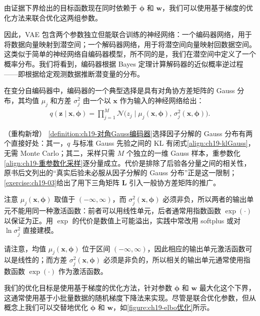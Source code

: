 \documentclass[../../main.tex]{subfiles}
\begin{document}
由证据下界给出的目标函数现在同时依赖于 $\bm{\phi}$ 和 $\bm{w}$，我们可以使用基于梯度的优化方法来联合优化这两组参数。

因此，VAE 包含两个参数独立但能联合训练的神经网络：一个编码器网络，用于将数据向量映射到潜空间；一个解码器网络，用于将潜空间向量映射回数据空间。这类似于简单的神经网络自编码器模型，所不同的是，我们在潜空间中定义了一个概率分布。我们将看到，编码器根据 Bayes 定理计算解码器的近似概率逆过程——即根据给定观测数据推断潜变量的分布。

\begin{definition}\label{definition:ch19-对角Gauss编码器}
在变分自编码器中，编码器的一个典型选择是具有对角协方差矩阵的 Gauss 分布，其均值 $\mu_j$ 和方差 $\sigma_j^{2}$ 由一个以 $\bm{x}$ 作为输入的神经网络给出：
\begin{align}
q(\bm{z}\mid\bm{x},\bm{\phi})=\prod_{j=1}^{M}\mathcal{N}\big(z_j\mid\mu_j(\bm{x},\bm{\phi}),\,\sigma_j^{2}(\bm{x},\bm{\phi})\big).
\label{align:ch19-编码器}
\end{align}
\end{definition}

\begin{remark}（重构新增）
\cref{definition:ch19-对角Gauss编码器}选择因子分解的 Gauss 分布有两个直接好处：其一，$q$ 与标准 Gauss 先验之间的 KL 有闭式\eqref{align:ch19-klGauss}，无需 Monte Carlo；其二，采样只需 $M$ 个独立的一维 Gauss 样本，重参数化\eqref{align:ch19-重参数化采样}逐分量成立。代价是排除了后验各分量之间的相关性，原书后文列出的“真实后验未必服从因子分解的 Gauss 分布”正是这一限制；\cref{exercise:ch19-03}给出了用下三角矩阵 $\bm{L}$ 引入一般协方差矩阵的推广。

注意 $\mu_j(\bm{x},\bm{\phi})$ 取值于 $(-\infty,\infty)$，而 $\sigma_j^{2}(\bm{x},\bm{\phi})$ 必须非负，所以两者的输出单元不能用同一种激活函数：前者可以用线性单元，后者通常用指数函数 $\exp(\cdot)$ 以保证为正。用 $\exp$ 的代价是数值上可能溢出，实践中常改用 softplus 或对 $\ln\sigma_j^{2}$ 直接建模。
\end{remark}

请注意，均值 $\mu_j(\bm{x},\bm{\phi})$ 位于区间 $(-\infty,\infty)$，因此相应的输出单元激活函数可以是线性的；而方差 $\sigma_j^{2}(\bm{x},\bm{\phi})$ 必须是非负的，所以相关的输出单元通常使用指数函数 $\exp(\cdot)$ 作为激活函数。

我们的优化目标是使用基于梯度的优化方法，针对参数 $\bm{\phi}$ 和 $\bm{w}$ 最大化这个下界，这通常使用基于小批量数据的随机梯度下降法来实现。尽管是联合优化参数，但从概念上我们可以交替地优化 $\bm{\phi}$ 和 $\bm{w}$，如\cref{figure:ch19-elbo优化}所示。
\end{document}
